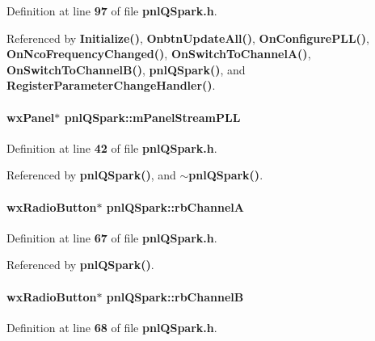 Definition at line {\bf 97} of file {\bf pnl\+Q\+Spark.\+h}.



Referenced by {\bf Initialize()}, {\bf Onbtn\+Update\+All()}, {\bf On\+Configure\+P\+L\+L()}, {\bf On\+Nco\+Frequency\+Changed()}, {\bf On\+Switch\+To\+Channel\+A()}, {\bf On\+Switch\+To\+Channel\+B()}, {\bf pnl\+Q\+Spark()}, and {\bf Register\+Parameter\+Change\+Handler()}.

\paragraph[{m\+Panel\+Stream\+P\+LL}]{\setlength{\rightskip}{0pt plus 5cm}wx\+Panel$\ast$ pnl\+Q\+Spark\+::m\+Panel\+Stream\+P\+LL}\label{classpnlQSpark_ada7de4993573649947e0594edd26db9b}


Definition at line {\bf 42} of file {\bf pnl\+Q\+Spark.\+h}.



Referenced by {\bf pnl\+Q\+Spark()}, and {\bf $\sim$pnl\+Q\+Spark()}.

\paragraph[{rb\+ChannelA}]{\setlength{\rightskip}{0pt plus 5cm}wx\+Radio\+Button$\ast$ pnl\+Q\+Spark\+::rb\+ChannelA}\label{classpnlQSpark_af8c6861dd0a69a23a2a797db2dd198d4}


Definition at line {\bf 67} of file {\bf pnl\+Q\+Spark.\+h}.



Referenced by {\bf pnl\+Q\+Spark()}.

\paragraph[{rb\+ChannelB}]{\setlength{\rightskip}{0pt plus 5cm}wx\+Radio\+Button$\ast$ pnl\+Q\+Spark\+::rb\+ChannelB}\label{classpnlQSpark_ac9c6dd3357dcd2e0e06144e419f741f9}


Definition at line {\bf 68} of file {\bf pnl\+Q\+Spark.\+h}.



